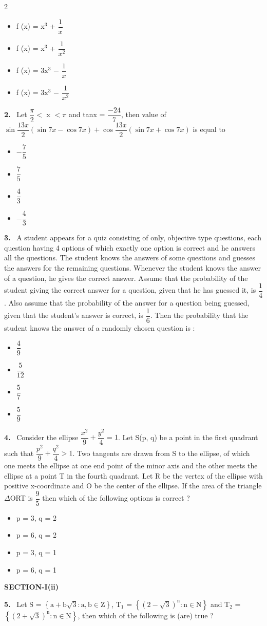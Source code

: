\documentclass[10pt]{extarticle}
\newcommand{\sect}[1]{\par\smallskip\noindent\textbf{#1}\par}
\newcommand{\qn}[1]{\par\smallskip\noindent\textbf{#1.}~}
\newenvironment{qoptions}{\begin{itemize}[leftmargin=1.8em,itemsep=1pt,topsep=2pt,label={}]}{\end{itemize}}
\newcommand{\opt}[2]{\item[(#1)] #2}
\begin{document}
\begin{multicols}{2}
\begin{qoptions}
\opt{A}{f (x) = x$^3$ + $\dfrac1x$}
\opt{B}{f (x) = x$^3$ + $\dfrac1{x^2}$}
\opt{C}{f (x) = 3x$^3$ $-$ $\dfrac1x$}
\opt{D}{f (x) = 3x$^3$ $-$ $\dfrac1{x^2}$}
\end{qoptions}
\qn{2} Let $\dfrac\pi2<$ x $<\pi$ and tanx = $\dfrac{-24}7$, then value of $\sin\dfrac{13x}2(\sin7x-\cos7x)+\cos\dfrac{13x}2(\sin7x+\cos7x)$ is equal to
\begin{qoptions}
\opt{A}{$-\dfrac75$}
\opt{B}{$\dfrac75$}
\opt{C}{$\dfrac43$}
\opt{D}{$-\dfrac43$}
\end{qoptions}
\qn{3} A student appears for a quiz consisting of only, objective type questions, each question having 4 options of which exactly one option is correct and he answers all the questions. The student knows the answers of some questions and guesses the answers for the remaining questions. Whenever the student knows the answer of a question, he gives the correct answer. Assume that the probability of the student giving the correct answer for a question, given that he has guessed it, is $\dfrac14$. Also assume that the probability of the answer for a question being guessed, given that the student's answer is correct, is $\dfrac16$. Then the probability that the student knows the answer of a randomly chosen question is :
\begin{qoptions}
\opt{A}{$\dfrac49$}
\opt{B}{$\dfrac5{12}$}
\opt{C}{$\dfrac57$}
\opt{D}{$\dfrac59$}
\end{qoptions}
\qn{4} Consider the ellipse $\dfrac{x^2}9+\dfrac{y^2}4=1$. Let S(p, q) be a point in the first quadrant such that $\dfrac{p^2}9+\dfrac{q^2}4>1$. Two tangents are drawn from S to the ellipse, of which one meets the ellipse at one end point of the minor axis and the other meets the ellipse at a point T in the fourth quadrant. Let R be the vertex of the ellipse with positive x-coordinate and O be the center of the ellipse. If the area of the triangle $\Delta$ORT is $\dfrac95$ then which of the following options is correct ?
\begin{qoptions}
\opt{A}{p = 3, q = 2}
\opt{B}{p = 6, q = 2}
\opt{C}{p = 3, q = 1}
\opt{D}{p = 6, q = 1}
\end{qoptions}
\sect{SECTION-I(ii)}
\qn{5} Let S = $\left\{\mathrm a+\mathrm b\sqrt3:\mathrm a,\mathrm b\in\mathrm Z\right\}$, T$_1$ = $\left\{\left(2-\sqrt3\right)^{\mathrm n}:\mathrm n\in\mathrm N\right\}$ and T$_2$ = $\left\{\left(2+\sqrt3\right)^{\mathrm n}:\mathrm n\in\mathrm N\right\}$, then which of the following is (are) true ?
\begin{qoptions}

\end{qoptions}
\end{multicols}
\end{document}
